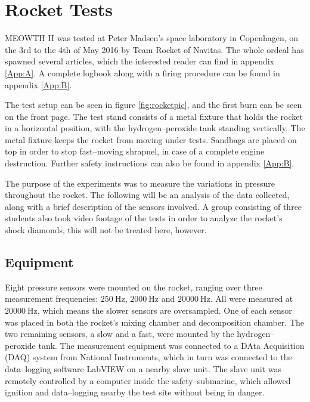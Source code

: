 \chapter{Rocket Tests}\label{cha:experimental}

	MEOWTH II was tested at Peter Madsen's space laboratory in Copenhagen, on the 3rd to the 4th of May 2016 by Team Rocket of Navitas. The whole ordeal has spawned several articles, which the interested reader can find in appendix \ref{App:A}. A  complete logbook along with a firing procedure can be found in appendix \ref{App:B}.

	The test setup can be seen in figure \ref{fig:rocketpic}, and the first burn can be seen on the front page. The test stand consists of a metal fixture that holds the rocket in a horizontal position, with the hydrogen--peroxide tank standing vertically. The metal fixture keeps the rocket from moving under tests. Sandbags are placed on top in order to stop fast--moving shrapnel, in case of a complete engine destruction. Further safety instructions can also be found in appendix \ref{App:B}.

	The purpose of the experiments was to measure the variations in pressure throughout the rocket. The following will be an analysis of the data collected, along with a brief description of the sensors involved. A group consisting of three students also took video footage of the tests in order to analyze the rocket's shock diamonds, this will not be treated here, however.

	\section{Equipment}

	Eight pressure sensors were mounted on the rocket, ranging over three measurement frequencies: $\SI{250}{\Hz}$, $\SI{2000}{\Hz}$ and $\SI{20000}{\Hz}$. All were measured at $\SI{20000}{\Hz}$, which means the slower sensors are oversampled. One of each sensor was placed in both the rocket's mixing chamber and decomposition chamber. The two remaining sensors, a slow and a fast, were mounted by the hydrogen--peroxide tank. The measurement equipment was connected to a DAta Acquisition (DAQ) system from National Instruments, which in turn was connected to the data--logging software LabVIEW on a nearby slave unit. The slave unit was remotely controlled by a computer inside the safety--submarine, which allowed ignition and data--logging nearby the test site without being in danger.

